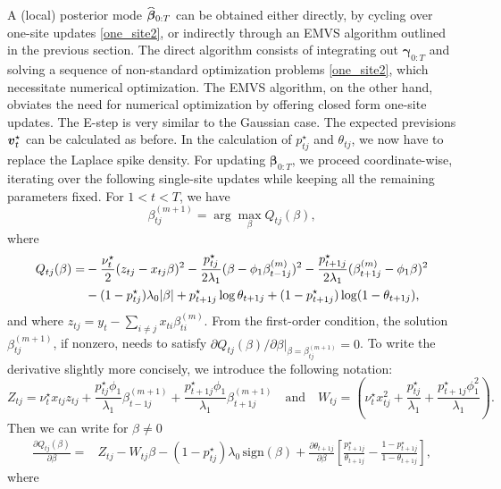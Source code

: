 \documentclass[ba]{imsart}
\numberwithin{equation}{section}
\theoremstyle{plain}
\def\b{\mbox{\boldmath$b$}}
\def\v{\mbox{\boldmath$v$}}
\newcommand{\bm}[1]{\boldsymbol{#1}}
\newcommand{\wh}[1]{\smash{\widehat{#1}}}
\def\bg{\bm{\gamma}}
\def\b{\bm{\beta}}
\begin{document}
A (local) posterior mode $\wh\b_{0:T}$ can be obtained either directly, by cycling over one-site updates \eqref{one_site2}, or indirectly through an EMVS algorithm outlined in the previous section. The direct
algorithm consists of integrating out $\bg_{0:T}$ and solving a sequence of non-standard optimization problems \eqref{one_site2}, which necessitate numerical optimization. The EMVS algorithm, on the other hand, obviates the need for numerical optimization by offering closed form one-site updates. The E-step is very similar to the Gaussian case. The expected previsions $\v_t^\star$ can be calculated as before. In the calculation of $p^\star_{tj}$ and $\theta_{tj}$, we now have to replace the Laplace spike density. For updating $\b_{0:T}$,
we proceed coordinate-wise, iterating over the following single-site updates while keeping all the remaining parameters fixed.  For $1<t<T$, we have
$$
\beta_{tj}^{(m+1)}=\arg\max_\beta Q_{tj}(\beta),
$$
where
\begin{align}
Q_{tj}(\beta)=&-\frac{\nu^\star_t}{2}(z_{tj}-x_{tj}\beta)^2-\frac{p^\star_{tj}}{2\lambda_1}(\beta-\phi_1\beta_{t-1j}^{(m)})^2-
\frac{p^\star_{t+1j}}{2\lambda_1}(\beta_{t+1j}^{(m)}-\phi_1\beta)^2\notag\\
&-(1-p^\star_{tj})\lambda_0|\beta|+p^\star_{t+1j}\log\theta_{t+1j}+(1-p^\star_{t+1j})\log(1-\theta_{t+1j})\label{q_tj},
\end{align}
and where $z_{tj}=y_t-\sum_{i\neq j}x_{ti}\beta_{ti}^{(m)}$. %
From the first-order condition, the solution $\beta_{tj}^{(m+1)}$, if nonzero, needs to satisfy  $\partial Q_{tj}(\beta)/\partial\beta\big|_{\beta=\beta_{tj}^{(m+1)}}=0$. 
To write the derivative slightly more concisely, we introduce the following notation: 
$$
Z_{tj}=\nu^\star_t x_{tj}z_{tj}+\frac{p^\star_{tj}\phi_1}{\lambda_1}\beta_{t-1j}^{(m+1)}+\frac{p^\star_{t+1j}\phi_1}{\lambda_1}\beta_{t+1j}^{(m+1)}
\quad\text{and}
\quad W_{tj}=\left(\nu^\star_t{x_{tj}^2}+\frac{p^\star_{tj}}{\lambda_1}+\frac{p^\star_{t+1j}\phi_1^2}{\lambda_1}\right).
$$
Then  we can write for $\beta\neq0$
\begin{align}\label{derivative}
\frac{\partial Q_{tj}(\beta)}{\partial \beta}=&Z_{tj}-
W_{tj}\beta
-(1-p^\star_{tj})\lambda_0\,\mathrm{sign}(\beta)+\frac{\partial \theta_{t+1j}}{\partial\beta}\left[\frac{p^\star_{t+1j}}{\theta_{t+1j}}-\frac{1-p^\star_{t+1j}}{1-\theta_{t+1j}}\right],
\end{align}
where 
\end{document}
